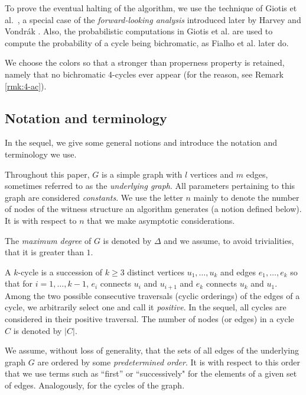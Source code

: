\documentclass{amsart}
\theoremstyle{plain}
\newcommand{\D}{\Delta}
\begin{document}
 To prove the eventual halting of the algorithm, we use the technique of Giotis
et al.~\cite{giotis2017acyclic}, a special case of the {\em forward-looking
analysis} introduced later by  Harvey and Vondr\'{a}k \cite{harvey2015algorithmic}. Also, the probabilistic computations in   Giotis et al.  are   used to compute the probability of a cycle being bichromatic, as   Fialho et al. \cite{fialho2020new} later do.


We choose the colors so that a stronger than properness property is retained, namely that no bichromatic 4-cycles ever appear (for the reason, see Remark \ref{rmk:4-ac}).
 
 

 
   
  
 \subsection{Notation and terminology}\label{ssec:not}  In the sequel, we give some general notions and introduce the notation and terminology we use. 
 
 
Throughout this paper, $G$ is a simple graph with $l$ vertices and $m$ edges, sometimes referred to as the {\em underlying graph}. All parameters pertaining to this graph are considered {\it constants}.  We use the letter $n$ mainly to denote  the number of  nodes of the witness structure an algorithm generates (a notion defined below). It is with respect  to  $n$ that we make asymptotic considerations. 
 
 

The \emph{maximum degree} of $G$ is denoted by $\D$ and we assume, to avoid trivialities, that it is greater than $1$. 


A $k$-cycle is a succession of $k\geq 3$ distinct vertices $u_1, \ldots, u_k$ and edges $e_1, \ldots,e_k$ so that for $i=1, \ldots, k-1$, $e_i$ connects  $u_i$ and $u_{i+1}$ and $e_k$ connects $u_{k}$ and $u_1$. Among the two possible consecutive traversals (cyclic orderings) of the edges  of  a cycle, we arbitrarily select one and call it {\em positive}. In the sequel, all cycles are considered in their positive traversal. The number of nodes (or edges)  in a cycle $C$  is denoted by $|C|$.

We assume, without loss of generality, that the sets of all
edges of the underlying graph $G$ are ordered by
some {\em predetermined order}. It is with respect to this order that 
we use terms such as ``first''  or ``successively"  for the elements of a given set of edges.  Analogously, for the cycles of the graph.
 
\end{document}
